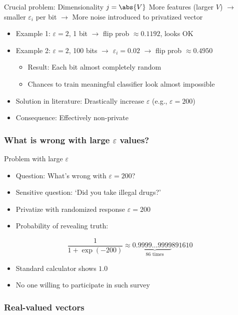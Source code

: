 \documentclass[12pt,aspectratio=169,handout]{beamer}
\begin{document}
\begin{frame}{Crucial problem: Dimensionality $j = \abs{V}$}
More features (larger $V$) $\rightarrow$ smaller $\varepsilon_i$ per bit $\rightarrow$ More noise introduced to privatized vector
\begin{itemize}
\item Example 1: $\varepsilon = 2$, 1 bit $\rightarrow$ flip prob $\approx 0.1192$, looks OK
\item Example 2: $\varepsilon = 2$, 100 bits $\rightarrow$ $\varepsilon_i = 0.02$ $\rightarrow$ flip prob $\approx 0.4950$
\begin{itemize}
\item Result: Each bit almost completely random
\item Chances to train meaningful classifier look almost impossible
\end{itemize}
\item Solution in literature: Drastically increase $\varepsilon$ (e.g., $\varepsilon = 200$)
\item Consequence: Effectively non-private
\end{itemize}
\end{frame}

\subsubsection{What is wrong with large $\varepsilon$ values?}
\label{sec:what.is.wrong.with.large.epsilons}

\begin{frame}{Problem with large $\varepsilon$}
\begin{itemize}
\item Question: What's wrong with $\varepsilon = 200$?
\item Sensitive question: `Did you take illegal drugs?'
\item Privatize with randomized response $\varepsilon = 200$
\item Probability of revealing truth:
\end{itemize}
$$
\frac{1}{1 + \exp(-200)} \approx 0.\underbrace{9999\ldots9999}_{\text{86 times}}891610
$$
\begin{itemize}
\item Standard calculator shows $1.0$
\item No one willing to participate in such survey
\end{itemize}
\end{frame}

\subsubsection{Real-valued vectors}
\end{document}

